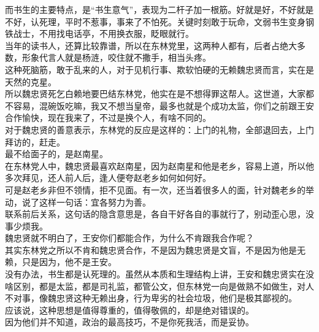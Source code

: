 \begin{multicols}{\theparacolNo}
而书生的主要特点，是“书生意气”，表现为二杆子加一根筋。好就是好，不好就是不好，认死理，平时不惹事，事来了不怕死。关键时刻敢于玩命，文弱书生变身钢铁战士，不用找电话亭，不用换衣服，眨眼就行。\\

当年的读书人，还算比较靠谱，所以在东林党里，这两种人都有，后者占绝大多数，形象代言人就是杨涟，咬住就不撒手，相当头疼。\\

这种死脑筋，敢于乱来的人，对于见机行事、欺软怕硬的无赖魏忠贤而言，实在是天然的克星。\\

所以魏忠贤死乞白赖地要巴结东林党，他实在是不想得罪这帮人。这世道，大家都不容易，混碗饭吃嘛，我又不想当皇帝，最多也就是个成功太监，你们之前跟王安合作愉快，现在我来了，不过是换个人，有啥不同的。\\

对于魏忠贤的善意表示，东林党的反应是这样的：上门的礼物，全部退回去，上门拜访的，赶走。\\

最不给面子的，是赵南星。\\

在东林党人中，魏忠贤最喜欢赵南星，因为赵南星和他是老乡，容易上道，所以他多次拜见，还人前人后，逢人便夸赵老乡如何如何好。\\

可是赵老乡非但不领情，拒不见面。有一次，还当着很多人的面，针对魏老乡的举动，说了这样一句话：宜各努力为善。\\

联系前后关系，这句话的隐含意思是，各自干好各自的事就行了，别动歪心思，没事少烦我。\\

魏忠贤就不明白了，王安你们都能合作，为什么不肯跟我合作呢？\\

其实东林党之所以不肯和魏忠贤合作，不是因为魏忠贤是文盲，不是因为他是无赖，只是因为，他不是王安。\\

没有办法，书生都是认死理的。虽然从本质和生理结构上讲，王安和魏忠贤实在没啥区别，都是太监，都是司礼监，都管公文，但东林党一向是做熟不如做生，对人不对事，像魏忠贤这种无赖出身，行为卑劣的社会垃圾，他们是极其鄙视的。\\

应该说，这种思想是值得尊重的，值得敬佩的，却是绝对错误的。\\

因为他们并不知道，政治的最高技巧，不是你死我活，而是妥协。\\


\end{multicols}
